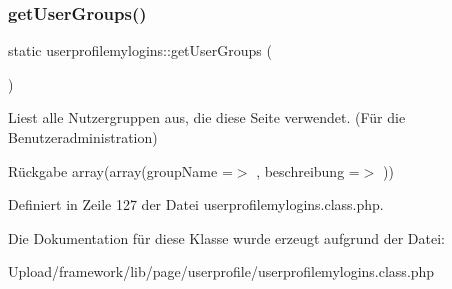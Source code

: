 \mbox{\label{classuserprofilemylogins_a9bcef2f2cb8485edda7878b59aa4962c}} 
\subsubsection{\texorpdfstring{get\+User\+Groups()}{getUserGroups()}}
{\footnotesize\ttfamily static userprofilemylogins\+::get\+User\+Groups (\begin{DoxyParamCaption}{ }\end{DoxyParamCaption})\hspace{0.3cm}{\ttfamily [static]}}

Liest alle Nutzergruppen aus, die diese Seite verwendet. (Für die Benutzeradministration) \begin{DoxyReturn}{Rückgabe}
array(array(\textquotesingle{}group\+Name\textquotesingle{} =$>$ \textquotesingle{}\textquotesingle{}, \textquotesingle{}beschreibung\textquotesingle{} =$>$ \textquotesingle{}\textquotesingle{})) 
\end{DoxyReturn}


Definiert in Zeile 127 der Datei userprofilemylogins.\+class.\+php.



Die Dokumentation für diese Klasse wurde erzeugt aufgrund der Datei\+:\begin{DoxyCompactItemize}
\item 
Upload/framework/lib/page/userprofile/userprofilemylogins.\+class.\+php\end{DoxyCompactItemize}
